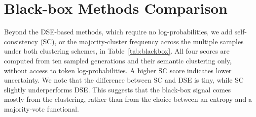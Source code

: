 \section{Black-box Methods Comparison}
\label{app:black_box}
Beyond the DSE-based methods, which require no log-probabilities, we add self-consistency (SC), or the majority-cluster frequency across the multiple samples under both clustering schemes, in Table~\ref{tab:blackbox}. All four scores are computed from ten sampled generations and their semantic clustering only, without access to token log-probabilities. A higher SC score indicates lower uncertainty. We note that the difference between SC and DSE is tiny, while SC slightly underperforms DSE. This suggests that the black-box signal comes mostly from the clustering, rather than from the choice between an entropy and a majority-vote functional.

